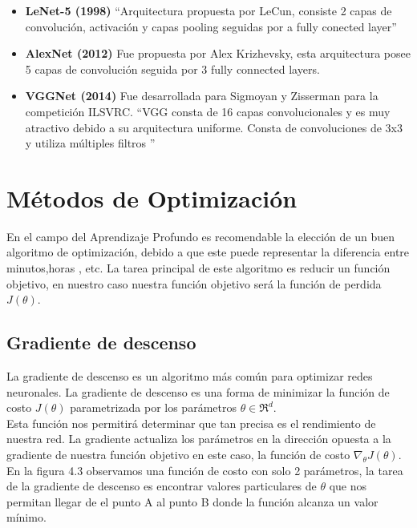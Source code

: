 \begin{itemize}
	\item \textbf{LeNet-5 (1998)} \textquotedblleft Arquitectura propuesta por LeCun, consiste 2 capas de convolución, activación  y capas pooling seguidas por a fully conected layer\textquotedblright \cite{WEBSITE:9}
	\vspace{1cm}
	\item \textbf{AlexNet (2012)} Fue propuesta por Alex Krizhevsky, esta arquitectura posee 5 capas de convolución seguida por 3 fully connected layers.
	\vspace{1cm}
	\item \textbf{VGGNet (2014)} Fue desarrollada para Sigmoyan y Zisserman para la competición ILSVRC. \textquotedblleft VGG consta de 16 capas convolucionales y es muy atractivo debido a su arquitectura uniforme. Consta de convoluciones de 3x3 y utiliza múltiples filtros \textquotedblright \cite{WEBSITE:10}	
\end{itemize}
\vspace{5cm}
\section{Métodos de Optimización}
En el campo del Aprendizaje Profundo es recomendable la elección de un buen algoritmo de optimización, debido a que este puede representar la diferencia entre minutos,horas , etc. La tarea principal de este algoritmo es reducir un función objetivo, en nuestro caso nuestra función objetivo será la función de perdida $J(\theta)$. 

\subsection{Gradiente de descenso}
La gradiente de descenso es un algoritmo más común para optimizar redes neuronales. La gradiente de descenso es una forma de minimizar la función de costo $J(\theta)$ parametrizada por los parámetros $\theta \in\Re^{d}$.\\ Esta función nos permitirá determinar que tan precisa es el rendimiento de nuestra red. La gradiente actualiza los parámetros en la dirección opuesta a la gradiente de nuestra función objetivo en este caso, la función de costo $\nabla_{\theta} J(\theta)$.\\ En la figura 4.3 observamos una función de costo con solo 2 parámetros, la tarea de la gradiente de descenso es encontrar valores particulares de $\theta$ que nos permitan llegar de el punto A al punto B donde la función alcanza un valor mínimo. 

